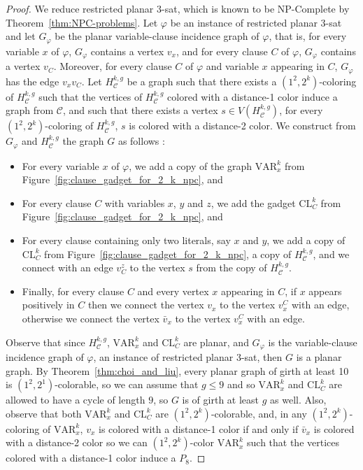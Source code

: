 \documentclass{article}
\newcommand{\colo}[2]{(1^{#1}, 2^{#2})}
\begin{document}
\begin{proof}
    We reduce {\sc restricted planar 3-sat}, which is known to be NP-Complete by Theorem~\ref{thm:NPC-problems}. Let $\varphi$ be an instance of {\sc restricted planar 3-sat} and let $G_\varphi$ be the planar variable-clause incidence graph of $\varphi$, that is, for every variable $x$ of $\varphi$, $G_\varphi$ contains a vertex $v_x$, and for every clause $C$ of $\varphi$, $G_\varphi$ contains a vertex $v_C$. Moreover, for every clause $C$ of $\varphi$ and variable $x$ appearing in $C$, $G_\varphi$ has the edge $v_xv_C$.
    Let $H_\mathcal{C}^{k, g}$ be a graph such that there exists a $\colo{2}{k}$-coloring of $H_\mathcal{C}^{k, g}$ such that the vertices of $H_\mathcal{C}^{k, g}$ colored with a distance-1 color induce a graph from $\mathcal{C}$, and such that there exists a vertex $s \in V(H_\mathcal{C}^{k, g})$, for every $\colo{2}{k}$-coloring of $H_\mathcal{C}^{k, g}$, $s$ is colored with a distance-2 color. 
    We construct from $G_\varphi$ and $H_\mathcal{C}^{k, g}$ the graph $G$ as follows :
    \begin{itemize}
        \item For every variable $x$ of $\varphi$, we add a copy of the graph $\textrm{VAR}_x^k$ from Figure~\ref{fig:clause_gadget_for_2_k_npc}, and
        \item For every clause $C$ with variables $x$, $y$ and $z$, we add the gadget $\textrm{CL}_C^k$ from Figure~\ref{fig:clause_gadget_for_2_k_npc}, and
        \item For every clause containing only two literals, say $x$ and $y$, we add a copy of $\textrm{CL}_C^k$ from Figure~\ref{fig:clause_gadget_for_2_k_npc}, a copy of $H_\mathcal{C}^{k, g}$, and we connect with an edge $v_C^z$ to the vertex $s$ from the copy of $H_\mathcal{C}^{k, g}$.
        \item Finally, for every clause $C$ and every vertex $x$ appearing in $C$, if $x$ appears positively in $C$ then we connect the vertex $v_x$ to the vertex $v^C_x$ with an edge, otherwise we connect the vertex $\bar{v}_x$ to the vertex $v^C_x$ with an edge.
    \end{itemize}
    Observe that since $H_\mathcal{C}^{k, g}$, $\textrm{VAR}^k_x$ and $\textrm{CL}^k_C$ are planar, and $G_\varphi$ is the variable-clause incidence graph of $\varphi$, an instance of {\sc restricted planar 3-sat}, then $G$ is a planar graph. By Theorem~\ref{thm:choi_and_liu}, every planar graph of girth at least 10 is $\colo{2}{1}$-colorable, so we can assume that $g \leq 9$ and so $\textrm{VAR}^k_x$ and $\textrm{CL}^k_C$ are allowed to have a cycle of length $9$, so $G$ is of girth at least $g$ as well. Also, observe that both $\textrm{VAR}^k_x$ and $\textrm{CL}^k_C$ are $\colo{2}{k}$-colorable, and, in any $\colo{2}{k}$-coloring of $\textrm{VAR}^k_x$, $v_x$ is colored with a distance-1 color if and only if $\bar{v}_x$ is colored with a distance-2 color so we can $\colo{2}{k}$-color $\textrm{VAR}^k_x$ such that the vertices colored with a distance-1 color induce a $P_8$.

\end{proof}
\end{document}
